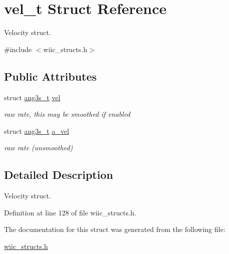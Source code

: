 \hypertarget{structvel__t}{\section{vel\-\_\-t Struct Reference}
\label{structvel__t}
}


Velocity struct.  




{\ttfamily \#include $<$wiic\-\_\-structs.\-h$>$}

\subsection*{Public Attributes}
\begin{DoxyCompactItemize}
\item 
\hypertarget{structvel__t_a76865c7b30e92bcae2097ec2b46aa692}{struct \hyperlink{structang3s__t}{ang3s\-\_\-t} \hyperlink{structvel__t_a76865c7b30e92bcae2097ec2b46aa692}{vel}}\label{structvel__t_a76865c7b30e92bcae2097ec2b46aa692}

\begin{DoxyCompactList}\small\item\em raw rate, this may be smoothed if enabled \end{DoxyCompactList}\item 
\hypertarget{structvel__t_a5443db069cfca456f3b8f5de9aaf1422}{struct \hyperlink{structang3s__t}{ang3s\-\_\-t} \hyperlink{structvel__t_a5443db069cfca456f3b8f5de9aaf1422}{a\-\_\-vel}}\label{structvel__t_a5443db069cfca456f3b8f5de9aaf1422}

\begin{DoxyCompactList}\small\item\em raw rate (unsmoothed) \end{DoxyCompactList}\end{DoxyCompactItemize}


\subsection{Detailed Description}
Velocity struct. 

Definition at line 128 of file wiic\-\_\-structs.\-h.



The documentation for this struct was generated from the following file\-:\begin{DoxyCompactItemize}
\item 
\hyperlink{wiic__structs_8h}{wiic\-\_\-structs.\-h}\end{DoxyCompactItemize}
